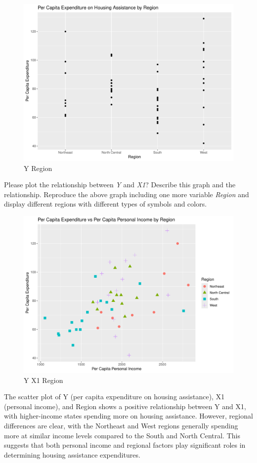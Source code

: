 \documentclass[12pt,letterpaper]{article}
\begin{document}
\begin{itemize}
 \begin{figure}[h!]\centering
	\caption{\footnotesize Y Region}
	\label{fig:2}
	\includegraphics[width=.75\textwidth]{Y_VS_Region.pdf}
\end{figure}

Please plot the relationship between \emph{Y} and \emph{X1}? Describe this graph and the relationship. Reproduce the above graph including one more variable \emph{Region} and display different regions with different types of symbols and colors.
\vspace{.2cm}
 
\end{itemize}

 \begin{figure}[h!]\centering
	\caption{\footnotesize Y X1 Region}
	\label{fig:4}
	\includegraphics[width=.75\textwidth]{Y_X1_Region.pdf}
\end{figure}
The scatter plot of Y (per capita expenditure on housing assistance), X1 (personal income), and Region shows a positive relationship between Y and X1, with higher-income states spending more on housing assistance. However, regional differences are clear, with the Northeast and West regions generally spending more at similar income levels compared to the South and North Central. This suggests that both personal income and regional factors play significant roles in determining housing assistance expenditures.\\
\end{document}
